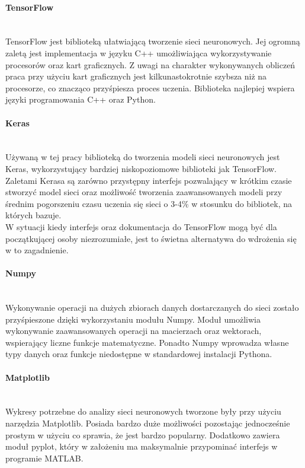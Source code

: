 \paragraph{TensorFlow} \mbox{}\\
TensorFlow jest biblioteką ułatwiającą tworzenie sieci neuronowych. Jej ogromną zaletą
jest implementacja w języku C++ umożliwiająca wykorzystywanie procesorów oraz kart graficznych.
Z uwagi na charakter  wykonywanych obliczeń praca przy użyciu kart graficznych jest
kilkunastokrotnie szybsza niż na procesorze, co znacząco przyśpiesza proces uczenia.
Biblioteka najlepiej wspiera języki programowania C++ oraz Python.

\paragraph{Keras} \mbox{}\\
Używaną w tej pracy biblioteką do tworzenia modeli sieci neuronowych jest Keras,
wykorzystujący bardziej niskopoziomowe biblioteki jak TensorFlow.
Zaletami Kerasa są zarówno przystępny interfejs pozwalający w krótkim czasie stworzyć model
sieci oraz możliwość tworzenia zaawansowanych modeli przy średnim pogorszeniu czasu
uczenia się sieci o 3-4\% w stosunku do bibliotek, na których bazuje.\\
W sytuacji kiedy interfejs oraz dokumentacja do TensorFlow mogą być dla początkującej
osoby niezrozumiałe, jest to świetna alternatywa do wdrożenia się w to zagadnienie.

\paragraph{Numpy} \mbox{}\\
Wykonywanie operacji na dużych zbiorach danych dostarczanych do sieci zostało przyśpieszone
dzięki wykorzystaniu modułu Numpy. Moduł umożliwia wykonywanie zaawansowanych operacji na macierzach
oraz wektorach, wspierający liczne funkcje matematyczne. Ponadto Numpy wprowadza własne
typy danych oraz funkcje niedostępne w standardowej instalacji Pythona.

\paragraph{Matplotlib} \mbox{}\\
Wykresy potrzebne do analizy sieci neuronowych tworzone były przy użyciu narzędzia Matplotlib.
Posiada bardzo duże możliwości pozostając jednocześnie prostym w użyciu co sprawia, że
jest bardzo popularny. Dodatkowo zawiera moduł pyplot, który w założeniu ma maksymalnie przypominać
interfejs w programie MATLAB.

